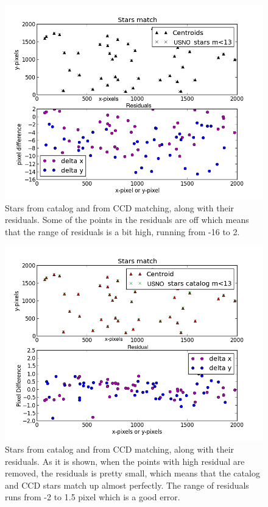 \documentclass[letterpaper,12pt]{article}
\begin{document}
\FloatBarrier
\begin{figure}[h!]
\centering
\includegraphics[scale=0.5]{stars_match_1.png}
\caption{Stars from catalog and from CCD matching, along with their residuals. Some of the points in the residuals are off which means that the range of residuals is a bit high, running from -16 to 2.}
\end{figure}
\FloatBarrier

\FloatBarrier
\begin{figure}[h!]
\centering
\includegraphics[scale=0.5]{stars_match_2.png}
\caption{Stars from catalog and from CCD matching, along with their residuals. As it is shown, when the points with high residual are removed, the residuals is pretty small, which means that the catalog and CCD stars match up almost perfectly. The range of residuals runs from -2 to 1.5 pixel which is a good error.}
\end{figure}
\FloatBarrier
\end{document}
